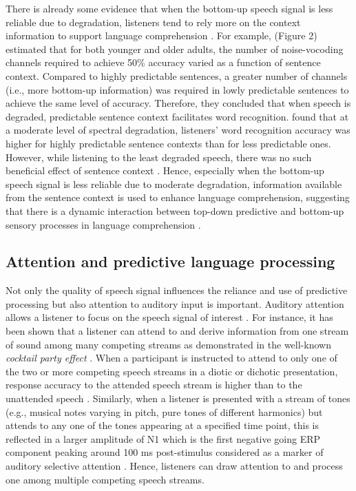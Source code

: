 \documentclass[a4paper, nobind]{templates/ociamthesis}
\begin{document}
There is already some evidence that when the bottom-up speech signal is less reliable due to degradation, listeners tend to rely more on the context information to support language comprehension \autocite{Amichetti2018,Obleser2010,Sheldon2008a}.
For example, \textcite{Sheldon2008a} (Figure 2) estimated that for both younger and older adults, the number of noise-vocoding channels required to achieve 50\% accuracy varied as a function of sentence context.
Compared to highly predictable sentences, a greater number of channels (i.e., more bottom-up information) was required in lowly predictable sentences to achieve the same level of accuracy.
Therefore, they concluded that when speech is degraded, predictable sentence context facilitates word recognition.
\textcite{Obleser2007} found that at a moderate level of spectral degradation, listeners' word recognition accuracy was higher for highly predictable sentence contexts than for less predictable ones.
However, while listening to the least degraded speech, there was no such beneficial effect of sentence context \autocite[see also][]{Obleser2010}.
Hence, especially when the bottom-up speech signal is less reliable due to moderate degradation, information available from the sentence context is used to enhance language comprehension, suggesting that there is a dynamic interaction between top-down predictive and bottom-up sensory processes in language comprehension \autocite{Bhandari2021}.

\hypertarget{attention-and-predictive-language-processing}{%
\subsection{Attention and predictive language processing}\label{attention-and-predictive-language-processing}}

Not only the quality of speech signal influences the reliance and use of predictive processing but also attention to auditory input is important.
Auditory attention allows a listener to focus on the speech signal of interest \autocites[for reviews, see][]{Fritz2007}[see also][]{Lange2013}.
For instance, it has been shown that a listener can attend to and derive information from one stream of sound among many competing streams as demonstrated in the well-known \emph{cocktail party effect} \autocite{Cherry1953,Hafter2007}.
When a participant is instructed to attend to only one of the two or more competing speech streams in a diotic or dichotic presentation, response accuracy to the attended speech stream is higher than to the unattended speech \autocite[e.g.,][]{Toth2020}.
Similarly, when a listener is presented with a stream of tones (e.g., musical notes varying in pitch, pure tones of different harmonics) but attends to any one of the tones appearing at a specified time point, this is reflected in a larger amplitude of N1 \autocites[e.g.,][]{Lange2010}[see also][]{Sanders2008}
which is the first negative going ERP component peaking around 100 ms post-stimulus considered as a marker of auditory selective attention \autocite{Naatanen1987,Thorton2007}.
Hence, listeners can draw attention to and process one among multiple competing speech streams.
\end{document}
